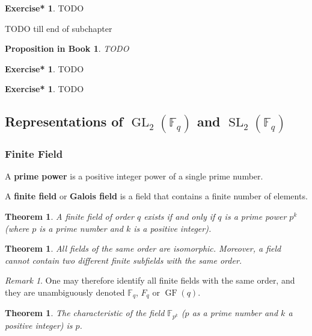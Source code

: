\documentclass[12pt, letterpaper]{article}
\newcommand{\GL}{\operatorname{GL}}
\newcommand{\SL}{\operatorname{SL}}
\newcommand{\red}[1]{{\color{red} #1}}
\newtheorem{thm}[prop]{Theorem}
\theoremstyle{definition}
\theoremstyle{remark}
\newtheorem*{rem*}{Remark}
\theoremstyle{definition}
\newtheorem{exe*}[exe]{Exercise*}
\theoremstyle{plain}
\newtheorem{pprop}[exe]{Proposition in Book}
\numberwithin{equation}{section}
\begin{document}
	
	\begin{exe*}
		\red{TODO}
	\end{exe*}
	\red{TODO till end of subchapter}
	
	\begin{pprop}
		\red{TODO}
	\end{pprop}
	\begin{exe*}
		\red{TODO}
	\end{exe*}

	\begin{exe*}
		\red{TODO}
	\end{exe*}

	\subsection{Representations of $\GL_2(\mathbb{F}_q)$ and $\SL_2(\mathbb{F}_q)$}
	\subsubsection{Finite Field}
	\begin{def*}
		A \textbf{prime power} is a positive integer power of a single prime number. 
	\end{def*}
	\begin{def*}
		A \textbf{finite field} or \textbf{Galois field} is a field that contains a finite number of elements. 
	\end{def*}
	\begin{thm}
		A finite field of order $q$ exists if and only if $q$ is a prime power $p^k$ (where $p$ is a prime number and $k$ is a positive integer).
	\end{thm}
	\begin{thm}
		All fields of the same order are isomorphic.
		Moreover, a field cannot contain two different finite subfields with the same order.
	\end{thm}
	\begin{rem*}
		One may therefore identify all finite fields with the same order, and they are unambiguously denoted $\mathbb  {F}_{q}$, $F_q$ or $\operatorname{GF}(q)$.
	\end{rem*}
	\begin{thm}
		The characteristic of the field $\mathbb{F}_{p^k}$ ($p$ as a prime number and $k$ a positive integer) is $p$.
	\end{thm}
\end{document}
